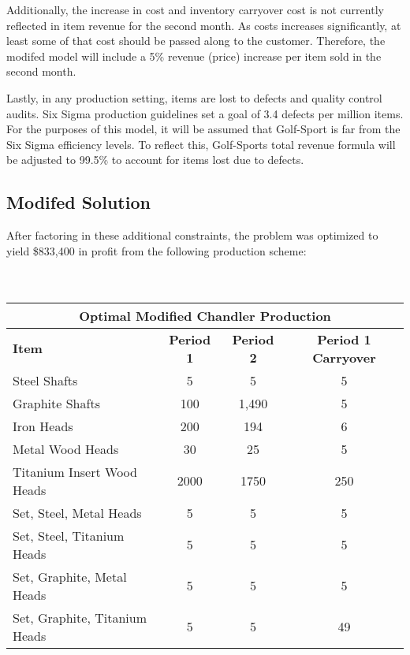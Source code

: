 \documentclass{article}
\begin{document}
\par
Additionally, the increase in cost and inventory carryover cost is not currently reflected in item revenue for the second month.  As costs increases significantly, at least some of that cost should be passed along to the customer.  Therefore, the modifed model will include a 5\% revenue (price) increase per item sold in the second month.
\par
Lastly, in any production setting, items are lost to defects and quality control audits.  Six Sigma production guidelines set a goal of 3.4 defects per million items.  For the purposes of this model, it will be assumed that Golf-Sport is far from the Six Sigma efficiency levels.  To reflect this, Golf-Sports total revenue formula will be adjusted to 99.5\% to account for items lost due to defects.
\subsection{Modifed Solution}
After factoring in these additional constraints, the problem was optimized to yield \$833,400 in profit from the following production scheme:
\\
\\
\\
\noindent
\begin{tabular}{ l | c | c | c }
\hline
\multicolumn{4}{|c|}{Optimal Modified Chandler Production} \\
\hline
\textbf{Item} & \textbf{Period 1} & \textbf{Period 2} & \textbf{Period 1 Carryover} \\
Steel Shafts & 5 & 5 & 5 \\
Graphite Shafts & 100 & 1,490 & 5 \\
Iron Heads & 200 & 194 & 6 \\
Metal Wood Heads & 30 & 25 & 5 \\
Titanium Insert Wood Heads & 2000 & 1750 & 250 \\
Set, Steel, Metal Heads & 5 & 5 & 5 \\
Set, Steel, Titanium Heads & 5 & 5 & 5 \\
Set, Graphite, Metal Heads & 5 & 5 & 5 \\
Set, Graphite, Titanium Heads & 5 & 5 & 49\\
\end{tabular}
\vspace{5mm}
\\
\noindent
\end{document}
